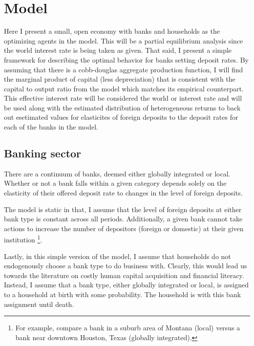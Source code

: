 \onlyinsubfile{\setcounter{section}{3}}
\section{Model}
\notinsubfile{\label{sec:Model}}

\par Here I present a small, open economy with banks and households as the optimizing agents in the model. This will be a partial equilibrium analysis since the world interest rate is being taken as given. That said, I present a simple framework for describing the optimal behavior for banks setting deposit rates. By assuming that there is a cobb-douglas aggregate production function, I will find the marginal product of capital (less depreciation) that is consistent with the capital to output ratio from the model which matches its empirical counterpart. This effective interest rate will be considered the world or  interest rate and will be used along with the estimated distribution of heterogeneous returns to back out esetimated values for elasticites of foreign deposits to the deposit rates for each of the banks in the model.  

\subsection{Banking sector}

\par There are a continuum of banks, deemed either globally integrated or local. Whether or not a bank falls within a given category depends solely on the elasticity of their offered deposit rate to changes in the level of foreign deposits.

\par The model is static in that, I assume that the level of foreign deposits at either bank type is constant across all periods. Additionally, a given bank cannot take actions to increase the number of depositors (foreign or domestic) at their given institution \footnote{For example, compare a bank in a suburb area of Montana (local) versus a bank near downtown Houston, Texas (globally integrated).}.

\par Lastly, in this simple version of the model, I assume that households do not endogenously choose a bank type to do business with. Clearly, this would lead us towards the literature on costly human capital acquisition and financial literacy. Instead, I assume that a bank type, either globally integrated or local, is assigned to a household at birth with some probability. The household is  with this bank assignment until death.

